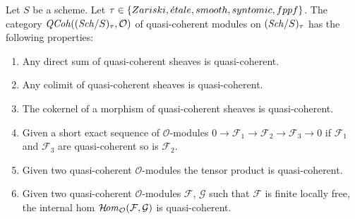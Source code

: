 \begin{lemma}
\label{lemma-properties-quasi-coherent-on-big}
Let $S$ be a scheme.
Let $\tau \in \{Zariski, \linebreak[0] \etale, \linebreak[0]
smooth, \linebreak[0] syntomic, \linebreak[0] fppf\}$.
The category $\mathit{QCoh}((\mathit{Sch}/S)_\tau, \mathcal{O})$
of quasi-coherent modules on $(\mathit{Sch}/S)_\tau$
has the following properties:
\begin{enumerate}
\item Any direct sum of quasi-coherent sheaves is quasi-coherent.
\item Any colimit of quasi-coherent sheaves is quasi-coherent.
\item The cokernel of a morphism of quasi-coherent sheaves
is quasi-coherent.
\item Given a short exact sequence of $\mathcal{O}$-modules
$0 \to \mathcal{F}_1 \to \mathcal{F}_2 \to \mathcal{F}_3 \to 0$
if $\mathcal{F}_1$ and $\mathcal{F}_3$ are quasi-coherent so is
$\mathcal{F}_2$.
\item Given two quasi-coherent $\mathcal{O}$-modules
the tensor product is quasi-coherent.
\item Given two quasi-coherent $\mathcal{O}$-modules
$\mathcal{F}$, $\mathcal{G}$ such that $\mathcal{F}$
is finite locally free, the internal hom
$\mathop{\mathcal{H}\!\mathit{om}}\nolimits_\mathcal{O}(\mathcal{F}, \mathcal{G})$
is quasi-coherent.
\end{enumerate}
\end{lemma}

